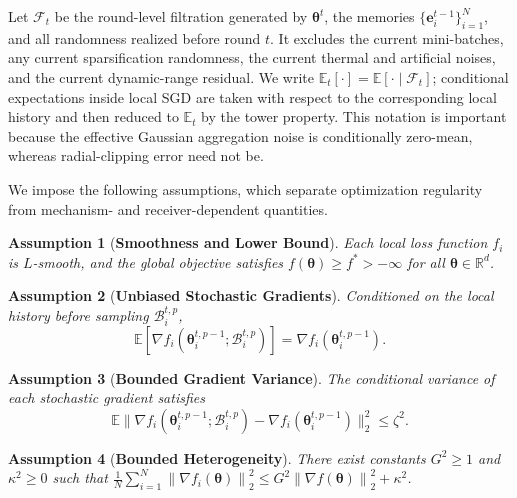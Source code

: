 \documentclass[journal]{IEEEtran}
\newenvironment{revisionblock}{\begingroup\color{revisionred}}{\endgroup}
\newtheorem{assumption}{Assumption}
\begin{document}
\begin{revisionblock}
Let $\mathcal{F}_t$ be the round-level filtration generated by $\boldsymbol{\theta}^t$, the memories $\{\mathbf{e}_i^{t-1}\}_{i=1}^{N}$, and all randomness realized before round $t$. It excludes the current mini-batches, any current sparsification randomness, the current thermal and artificial noises, and the current dynamic-range residual. We write $\mathbb{E}_t[\cdot]=\mathbb{E}[\cdot\mid\mathcal{F}_t]$; conditional expectations inside local SGD are taken with respect to the corresponding local history and then reduced to $\mathbb{E}_t$ by the tower property. This notation is important because the effective Gaussian aggregation noise is conditionally zero-mean, whereas radial-clipping error need not be.

We impose the following assumptions, which separate optimization regularity from mechanism- and receiver-dependent quantities.

\begin{assumption}[\bf Smoothness and Lower Bound]
	\label{assum:smoothness}
	Each local loss function $f_i$ is $L$-smooth, and the global objective satisfies $f(\boldsymbol{\theta}) \ge f^\ast > -\infty$ for all $\boldsymbol{\theta} \in \mathbb{R}^d$.
\end{assumption}

\begin{assumption}[\bf Unbiased Stochastic Gradients]
	\label{assum:unbiased}
	Conditioned on the local history before sampling $\mathcal{B}_i^{t,p}$,
	{
\begin{equation}
		\mathbb{E}[\nabla f_i(\boldsymbol{\theta}_i^{t,p-1};\mathcal{B}_i^{t,p})]
		=\nabla f_i(\boldsymbol{\theta}_i^{t,p-1}).
	\end{equation}
}
\end{assumption}

\begin{assumption}[\bf Bounded Gradient Variance]
	\label{assum:variance}
	The conditional variance of each stochastic gradient satisfies
	{
\begin{equation}
		\mathbb{E}\big\|\nabla f_i(\boldsymbol{\theta}_i^{t,p-1};\mathcal{B}_i^{t,p})
		-\nabla f_i(\boldsymbol{\theta}_i^{t,p-1})\big\|_2^2\le\zeta^2.
	\end{equation}
}
\end{assumption}

\begin{assumption}[\bf Bounded Heterogeneity]
	\label{assum:heterogeneity}
	There exist constants $G^2 \ge 1$ and $\kappa^2 \ge 0$ such that  $\frac{1}{N} \sum_{i=1}^N \left\lVert\nabla f_i(\boldsymbol{\theta})\right\rVert_2^2 \le G^2 \left\lVert\nabla f(\boldsymbol{\theta})\right\rVert_2^2 + \kappa^2$.
\end{assumption}


\end{revisionblock}
\end{document}
